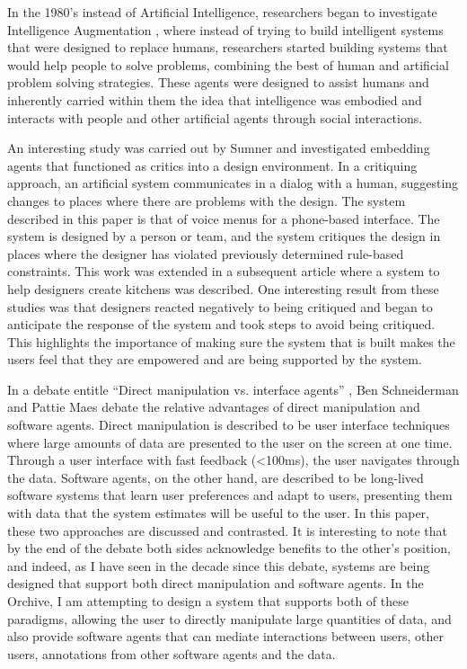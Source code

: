 In the 1980's instead of Artificial Intelligence, researchers began to
investigate Intelligence Augmentation \cite{fischer1992beyond}, where
instead of trying to build intelligent systems that were designed to
replace humans, researchers started building systems that would help
people to solve problems, combining the best of human and artificial
problem solving strategies.  These agents were designed to assist
humans and inherently carried within them the idea that intelligence
was embodied and interacts with people and other artificial agents
through social interactions.

An interesting study was carried out by Sumner
\cite{sumner1997cognitive} and investigated embedding agents that
functioned as critics into a design environment.  In a critiquing
approach, an artificial system communicates in a dialog with a human,
suggesting changes to places where there are problems with the design.
The system described in this paper is that of voice menus for a
phone-based interface.  The system is designed by a person or team,
and the system critiques the design in places where the designer has
violated previously determined rule-based constraints.  This work was
extended in a subsequent article \cite{fischer98embedding} where a
system to help designers create kitchens was described.  One
interesting result from these studies was that designers reacted
negatively to being critiqued and began to anticipate the response of
the system and took steps to avoid being critiqued.  This highlights
the importance of making sure the system that is built makes the users
feel that they are empowered and are being supported by the system.

In a debate entitle ``Direct manipulation vs. interface agents''
\cite{schneiderman1997direct}, Ben Schneiderman and Pattie Maes debate
the relative advantages of direct manipulation and software agents.
Direct manipulation is described to be user interface techniques where
large amounts of data are presented to the user on the screen at one
time.  Through a user interface with fast feedback (\textless100ms),
the user navigates through the data.  Software agents, on the other
hand, are described to be long-lived software systems that learn user
preferences and adapt to users, presenting them with data that the
system estimates will be useful to the user.  In this paper, these two
approaches are discussed and contrasted.  It is interesting to note
that by the end of the debate both sides acknowledge benefits to the
other's position, and indeed, as I have seen in the decade since this
debate, systems are being designed that support both direct
manipulation and software agents.  In the Orchive, I am attempting
to design a system that supports both of these paradigms, allowing the
user to directly manipulate large quantities of data, and also provide
software agents that can mediate interactions between users, other
users, annotations from other software agents and the data.

